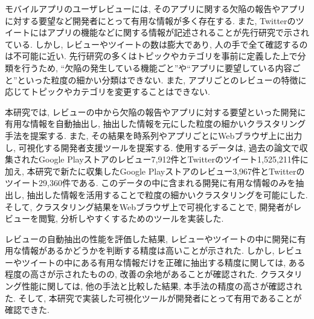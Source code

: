 
モバイルアプリのユーザレビューには, そのアプリに関する欠陥の報告やアプリに対する要望など開発者にとって有用な情報が多く存在する. また, Twitterのツイートにはアプリの機能などに関する情報が記述されることが先行研究で示されている. しかし, レビューやツイートの数は膨大であり, 人の手で全て確認するのは不可能に近い. 
先行研究の多くはトピックやカテゴリを事前に定義した上で分類を行うため, ``欠陥の発生している機能ごと''や``アプリに要望している内容ごと''といった粒度の細かい分類はできない. また, アプリごとのレビューの特徴に応じてトピックやカテゴリを変更することはできない. 

本研究では, レビューの中から欠陥の報告やアプリに対する要望といった開発に有用な情報を自動抽出し, 抽出した情報を元にした粒度の細かいクラスタリング手法を提案する. また, その結果を時系列やアプリごとにWebブラウザ上に出力し, 可視化する開発者支援ツールを提案する.
使用するデータは, 過去の論文で収集されたGoogle Playストアのレビュー7,912件とTwitterのツイート1,525,211件に加え, 本研究で新たに収集したGoogle Playストアのレビュー3,967件とTwitterのツイート29,360件である. このデータの中に含まれる開発に有用な情報のみを抽出し, 抽出した情報を活用することで粒度の細かいクラスタリングを可能にした. 
そして, クラスタリング結果をWebブラウザ上で可視化することで, 開発者がレビューを閲覧, 分析しやすくするためのツールを実装した. 

レビューの自動抽出の性能を評価した結果, レビューやツイートの中に開発に有用な情報があるかどうかを判断する精度は高いことが示された. 
しかし, レビューやツイートの中にある有用な情報だけを正確に抽出する精度に関しては, ある程度の高さが示されたものの, 改善の余地があることが確認された. 
クラスタリング性能に関しては, 他の手法と比較した結果, 本手法の精度の高さが確認された. 
そして, 本研究で実装した可視化ツールが開発者にとって有用であることが確認できた. 
